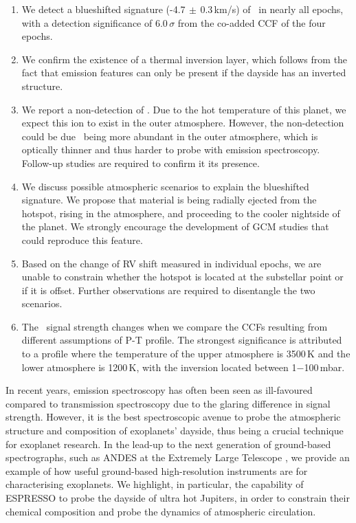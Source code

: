 \documentclass{aa}
\newcommand{\feI}{\ion{Fe}{i}}
\newcommand{\feII}{\ion{Fe}{ii}}
\begin{document}
\begin{enumerate}
    \item We detect a blueshifted signature (-4.7$\,\pm\,$0.3\,km/s) of \feI\ in nearly all epochs, with a detection significance of 6.0\,$\sigma$ from the co-added CCF of the four epochs.
    \item We confirm the existence of a thermal inversion layer, which follows from the fact that emission features can only be present if the dayside has an inverted structure.
    \item We report a non-detection of \feII. Due to the hot temperature of this planet, we expect this ion to exist in the outer atmosphere. However, the non-detection could be due \feII\ being more abundant in the outer atmosphere, which is optically thinner and thus harder to probe with emission spectroscopy. Follow-up studies are required to confirm it its presence.
    \item We discuss possible atmospheric scenarios to explain the blueshifted signature. We propose that material is being radially ejected from the hotspot, rising in the atmosphere, and proceeding to the cooler nightside of the planet. We strongly encourage the development of GCM studies that could reproduce this feature.
    \item Based on the change of RV shift measured in individual epochs, we are unable to constrain whether the hotspot is located at the substellar point or if it is offset. Further observations are required to disentangle the two scenarios.
    \item The \feI\ signal strength changes when we compare the CCFs resulting from different assumptions of P-T profile. The strongest significance is attributed to a profile where the temperature of the upper atmosphere is 3500\,K and the lower atmosphere is 1200\,K, with the inversion located between 1$-$100\,mbar.
\end{enumerate}

In recent years, emission spectroscopy has often been seen as ill-favoured compared to transmission spectroscopy due to the glaring difference in signal strength. However, it is the best spectroscopic avenue to probe the atmospheric structure and composition of exoplanets' dayside, thus being a crucial technique for exoplanet research. In the lead-up to the next generation of ground-based spectrographs, such as ANDES at the Extremely Large Telescope \citep{marconi2022}, we provide an example of how useful ground-based high-resolution instruments are for characterising exoplanets. We highlight, in particular, the capability of ESPRESSO to probe the dayside of ultra hot Jupiters, in order to constrain their chemical composition and probe the dynamics of atmospheric circulation.
\end{document}
